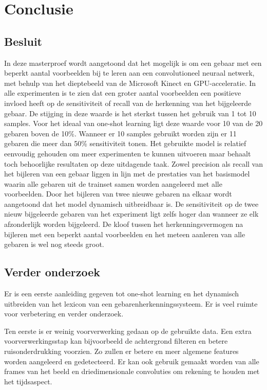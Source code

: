 \chapter{Conclusie}
\section{Besluit}
In deze masterproef wordt aangetoond dat het mogelijk is om een gebaar met een beperkt aantal voorbeelden bij te leren aan een convolutioneel neuraal netwerk, met behulp van het dieptebeeld van de Microsoft Kinect en GPU-acceleratie.
\npar In alle experimenten is te zien dat een groter aantal voorbeelden een positieve invloed heeft op de sensitiviteit of recall van de herkenning van het bijgeleerde gebaar. De stijging in deze waarde is het sterkst tussen het gebruik van 1 tot 10 samples. Voor het ideaal van one-shot learning ligt deze waarde voor 10 van de 20 gebaren boven de 10\%. Wanneer er 10 samples gebruikt worden zijn er 11 gebaren die meer dan 50\% sensitiviteit tonen. Het gebruikte model is relatief eenvoudig gehouden om meer experimenten te kunnen uitvoeren maar behaalt toch behoorlijke resultaten op deze uitdagende taak.
\npar Zowel precision als recall van het bijleren van een gebaar liggen in lijn met de prestaties van het basismodel waarin alle gebaren uit de trainset samen worden aangeleerd met alle voorbeelden. 
\npar Door het bijleren van twee nieuwe gebaren na elkaar wordt aangetoond dat het model dynamisch uitbreidbaar is. De sensitiviteit op de twee nieuw bijgeleerde gebaren van het experiment ligt zelfs hoger dan wanneer ze elk afzonderlijk worden bijgeleerd.
\npar De kloof tussen het herkenningsvermogen na bijleren met een beperkt aantal voorbeelden en het meteen aanleren van alle gebaren is wel nog steeds groot.
\section{Verder onderzoek}

Er is een eerste aanleiding gegeven tot one-shot learning en het dynamisch uitbreiden van het lexicon van een gebarenherkenningssysteem. Er is veel ruimte voor verbetering en verder onderzoek.

\npar Ten eerste is er weinig voorverwerking gedaan op de gebruikte data. Een extra voorverwerkingsstap kan bijvoorbeeld de achtergrond filteren en betere ruisonderdrukking voorzien. Zo zullen er betere en meer algemene features worden aangeleerd en gedetecteerd. Er kan ook gebruik gemaakt worden van alle frames van het beeld en driedimensionale convoluties om rekening te houden met het tijdsaspect.

